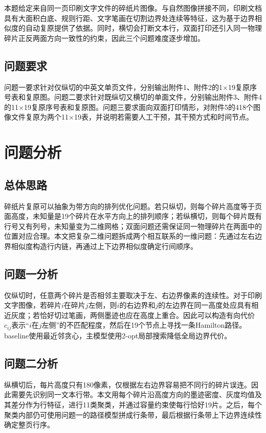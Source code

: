 \documentclass[UTF8,a4paper,12pt]{ctexart}
\begin{document}
本题给定来自同一页印刷文字文件的碎纸片图像。与自然图像拼接不同，印刷文档具有大面积白底、规则行距、文字笔画在切割边界处连续等特征，这为基于边界相似度的自动复原提供了依据。同时，横切会打断文本行，双面打印还引入同一物理碎片正反两面方向一致性的约束，因此三个问题难度逐步增加。

\subsection{问题要求}
问题一要求针对仅纵切的中英文单页文件，分别输出附件1、附件2的1×19复原序号表和复原图。问题二要求针对既纵切又横切的单面文件，分别输出附件3、附件4的11×19复原序号表和复原图。问题三要求面向双面打印情形，对附件5的418个图像文件复原为两个11×19表，并说明若需要人工干预，其干预方式和时间节点。

\section{问题分析}
\subsection{总体思路}
碎纸片复原可以抽象为带方向的排列优化问题。若只纵切，则每个碎片高度等于页面高度，未知量是19个碎片在水平方向上的排列顺序；若纵横切，则每个碎片既有行号又有列号，未知量变为二维网格；双面问题还需保证同一物理碎片在两面中的位置对应合理。本文把复杂二维问题拆成两个相互联系的一维问题：先通过左右边界相似度构造行内链，再通过上下边界相似度确定行间顺序。

\subsection{问题一分析}
仅纵切时，任意两个碎片是否相邻主要取决于左、右边界像素的连续性。对于印刷文字图像，若碎片$i$在碎片$j$左侧，则$i$的右边界和$j$的左边界在同一高度处应具有相近灰度；若恰好切过笔画，两侧墨迹也应在高度上重合。因此可以构造有向代价$c_{ij}$表示“$i$在$j$左侧”的不匹配程度，然后在19个节点上寻找一条Hamilton路径。baseline使用最近邻贪心，主模型使用2-opt局部搜索降低全局边界代价。

\subsection{问题二分析}
纵横切后，每片高度只有180像素，仅根据左右边界容易把不同行的碎片误连。因此需要先识别同一文本行带。本文用每个碎片沿高度方向的墨迹密度、灰度均值及其差分作为行特征，进行11类聚类，并通过容量约束使每行恰好19片。之后，每个聚类内部仍可使用问题一的路径模型拼成行条带，最后根据行条带上下边界连续性确定整页行序。
\end{document}
